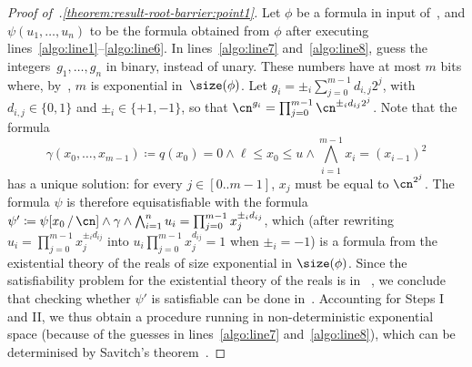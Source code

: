 \begin{proof}[Proof of~.\ref{theorem:result-root-barrier:point1}]
Let $\phi$ be a formula in input of~, and
$\psi(u_1,\dots,u_n)$ to be the formula obtained from $\phi$ after executing
lines~\ref{algo:line1}--\ref{algo:line6}. In lines~\ref{algo:line7}
and~\ref{algo:line8}, guess the integers~$g_1,\dots,g_n$ in binary, instead of
unary. These numbers have at most $m$ bits where,
by~, $m$ is exponential
in~$\size(\phi)$. Let $g_i = \pm_{i} \sum_{j=0}^{m-1} d_{i,j} 2^j$, with
$d_{i,j} \in \{0,1\}$ and $\pm_i \in \{+1,-1\}$, so that $\cn^{g_i} =
\prod_{j=0}^{m-1}\cn^{\pm_i d_{ij}2^j}$. Note that the formula 
\[ 
  \gamma(x_0,\dots,x_{m-1}) \coloneqq q(x_0) = 0 \land \ell \leq x_0 \leq u \land \textstyle\bigwedge_{i=1}^{m-1} x_i = (x_{i-1})^2
\]
has a unique solution: for every $j \in [0..m-1]$, $x_j$ must be equal to
$\cn^{2^j}$. The formula $\psi$ is therefore equisatisfiable with the formula
$\psi' \coloneqq \psi\sub{x_0}{\cn} \land \gamma \land \bigwedge_{i=1}^n u_i =
\prod_{j=0}^{m-1}x_j^{\pm_id_{ij}}$, which (after rewriting $u_i =
\prod_{j=0}^{m-1}x_j^{\pm_id_{ij}}$ into $u_i \prod_{j=0}^{m-1}x_j^{d_{ij}} = 1$
when $\pm_i = -1$) is a formula from the existential theory of the reals of size
exponential in $\size(\phi)$. Since the
satisfiability problem for the existential theory of the reals is in
\pspace~\cite{Canny88}, we conclude that checking whether $\psi'$ is satisfiable
can be done in~\expspace. Accounting for Steps I and II, we thus obtain a
procedure running in non-deterministic exponential space (because of the guesses
in lines~\ref{algo:line7} and~\ref{algo:line8}), which can be determinised by
Savitch's theorem~\cite{Savitch70}.
\end{proof}

